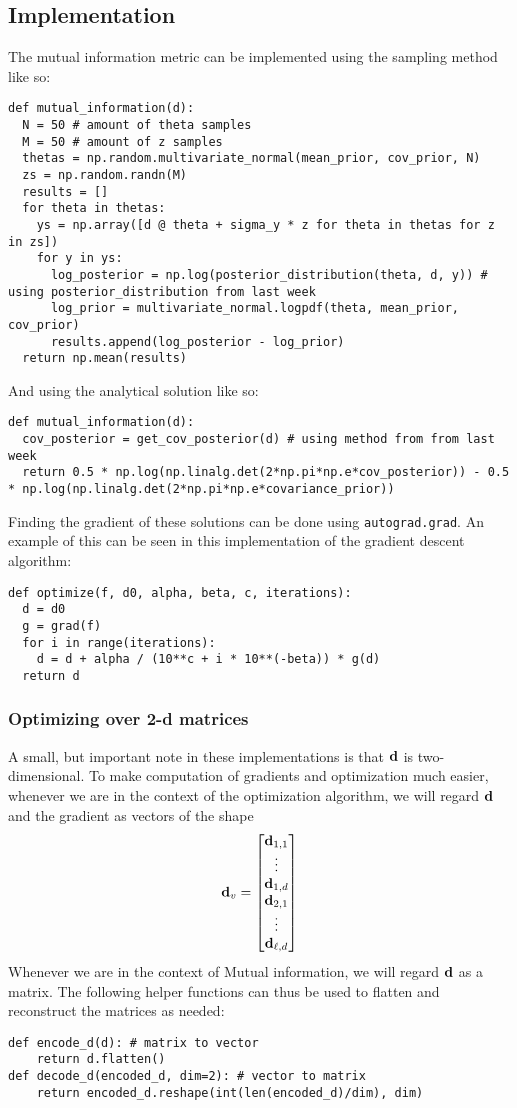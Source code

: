 \subsection{Implementation}
The mutual information metric can be implemented using the sampling method like so:
\begin{verbatim}
def mutual_information(d):
  N = 50 # amount of theta samples
  M = 50 # amount of z samples
  thetas = np.random.multivariate_normal(mean_prior, cov_prior, N)
  zs = np.random.randn(M)
  results = []
  for theta in thetas:
    ys = np.array([d @ theta + sigma_y * z for theta in thetas for z in zs])
    for y in ys:
      log_posterior = np.log(posterior_distribution(theta, d, y)) # using posterior_distribution from last week
      log_prior = multivariate_normal.logpdf(theta, mean_prior, cov_prior)
      results.append(log_posterior - log_prior)
  return np.mean(results)
\end{verbatim}

And using the analytical solution like so:
\begin{verbatim}
def mutual_information(d):
  cov_posterior = get_cov_posterior(d) # using method from from last week
  return 0.5 * np.log(np.linalg.det(2*np.pi*np.e*cov_posterior)) - 0.5 * np.log(np.linalg.det(2*np.pi*np.e*covariance_prior))
\end{verbatim}

Finding the gradient of these solutions can be done using \texttt{autograd.grad}. 
An example of this can be seen in this implementation of the gradient descent algorithm:
\begin{verbatim}
def optimize(f, d0, alpha, beta, c, iterations):
  d = d0
  g = grad(f)
  for i in range(iterations):
    d = d + alpha / (10**c + i * 10**(-beta)) * g(d)
  return d
\end{verbatim}

\subsubsection{Optimizing over 2-d matrices}
A small, but important note in these implementations is that $\mathbf{d}$ is two-dimensional.
To make computation of gradients and optimization much easier, whenever we are in the context of the optimization algorithm, we will regard $\mathbf{d}$ and the gradient as vectors of the shape
$$\mathbf{d}_v = \begin{bmatrix}\mathbf{d}_{1,1} \\ \vdots  \\ \mathbf{d}_{1,d} \\ \mathbf{d}_{2,1} \\ \vdots \\ \mathbf{d}_{\ell, d} \end{bmatrix}$$
Whenever we are in the context of Mutual information, we will regard $\mathbf{d}$ as a matrix. The following helper functions can thus be used to flatten and reconstruct the matrices as needed:
\begin{verbatim}
def encode_d(d): # matrix to vector
    return d.flatten()
def decode_d(encoded_d, dim=2): # vector to matrix
    return encoded_d.reshape(int(len(encoded_d)/dim), dim)
\end{verbatim}

